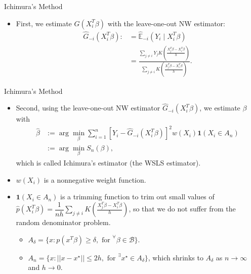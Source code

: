 \documentclass[xcolor=svgnames,dvipdfmx,cjk]{beamer}
\theoremstyle{example}
\begin{document}
\begin{frame}{Ichimura's Method}
  \begin{itemize}
  \item First, we estimate $G(X_i^{T}\beta)$  
        with the leave-one-out NW estimator:
        \begin{align*}
          \hat{G}_{-i}(X_i^{T}\beta) 
              :&= \hat{\mathbb{E}}_{-i}(Y_i \mid X_i^{T} \beta) \\
               &= \frac
                  {\sum_{j \neq i} Y_j 
                   K \left( \frac
                            {X_j^{T}\beta - X_i^{T}\beta}
                            {h} 
                     \right) 
                  }
                  {\sum_{j \neq i} 
                   K \left( \frac
                           {X_j^{T}\beta - X_i^{T}\beta}
                           {h} 
                     \right) 
                  }.
        \end{align*}
\end{itemize}
\end{frame}

\begin{frame}{Ichimura's Method}
  \begin{itemize}
    \item Second, 
          using the leave-one-out NW estimator $\hat{G}_{-i}(X_i^{T}\beta)$,
          we estimate $\beta$ with
          \begin{align*}
            \hat{\beta} 
              &:= \arg \min_{\beta} 
                    \sum_{i=1}^{n}  
                          \left[ Y_i - \hat{G}_{-i}(X_i^{T}\beta) \right]^2 
                          w(X_i) \mathbf{1}(X_i \in A_n) \\
              &:= \arg \min_{\beta} 
                  S_n(\beta),
          \end{align*}
          which is called \alert{Ichimura's estimator (the WSLS estimator)}.
    \item  $w(X_i)$ is a nonnegative weight function.
    \item  $\mathbf{1}(X_i \in A_n)$ is a trimming function to trim out small values of 
           $\hat{p}(X_i^{T}\beta) 
           =
           \dfrac{1}{nh} \sum_{j \neq i} 
              K \left( \frac
                       {X_j^{T}\beta - X_i^{T}\beta}
                       {h} 
                \right) $,
           so that we do not suffer from the random denominator problem. 
        \begin{itemize}
          \item $A_\delta = \{ x: p(x^{T}\beta) \geq \delta, \text{ for } ^\forall \beta \in \mathcal{B}\}$.
          \item $A_n = \{ x: || x - x^{\star} || \leq 2h, \text{ for } ^\exists x^{\star} \in A_\delta \}$, 
                which shrinks to $A_\delta$ as $n \to \infty$ and $h \to 0$.
        \end{itemize}
  \end{itemize}
\end{frame}
\end{document}

